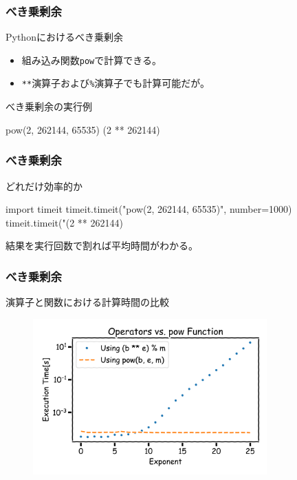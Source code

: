 \documentclass[aspectratio=169,dvipdfmx,14pt,notheorems]{beamer}
\theoremstyle{definition}
\begin{document}
\begin{frame}[fragile]\frametitle{べき乗剰余}

\begin{block}{Pythonにおけるべき乗剰余}
\begin{itemize}
\item 組み込み関数\texttt{pow}で計算できる。
\item \texttt{**}演算子および\texttt{\%}演算子でも計算可能だが。
\end{itemize}
\end{block}

\begin{exampleblock}{べき乗剰余の実行例}

\begin{pyconsole}
pow(2, 262144, 65535)
(2 ** 262144) %
\end{pyconsole}


\end{exampleblock}

\end{frame}

\begin{frame}[fragile]\frametitle{べき乗剰余}

\begin{exampleblock}{どれだけ効率的か}

\begin{pyconsole}
import timeit
timeit.timeit("pow(2, 262144, 65535)", number=1000)
timeit.timeit("(2 ** 262144) %
\end{pyconsole}

\end{exampleblock}
結果を実行回数で割れば平均時間がわかる。

\end{frame}

\begin{frame}[fragile]\frametitle{べき乗剰余}

\begin{exampleblock}{演算子と関数における計算時間の比較}
\begin{figure}
  \centering
  \includegraphics[width=9cm]{op_vs_func.png}
\end{figure}
\end{exampleblock}

\end{frame}
\end{document}
